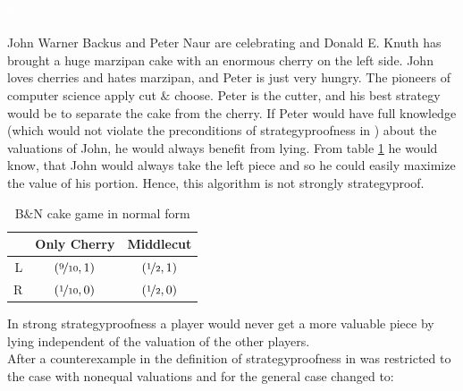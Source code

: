 \begin{bsp}
\label{bsp3}
\textcolor{white}{x}\\\\
John Warner Backus and Peter Naur are celebrating and Donald E. Knuth has brought a huge marzipan cake with an enormous cherry on the left side. John loves cherries and hates marzipan, and Peter is just very hungry. The pioneers of computer science apply cut $\&$ choose. Peter is the cutter, and his best strategy would be to separate the cake from the cherry. If Peter would have full knowledge (which would not violate the preconditions of strategyproofness in \cite{why}) about the valuations of John, he would always benefit from lying. From table \ref{Table4} he would know, that John would always take the left piece and so he could easily maximize the value of his portion. Hence, this algorithm is not strongly strategyproof.  
\end{bsp}
\begin{table}[htb]
\centering
 \renewcommand{\arraystretch}{1.2} 
\begin{tabular}{c|c|c|}
\cline{2-3}
&\multicolumn{1}{|c|}{{Only Cherry}}& {Middlecut}\\
\hline
\multicolumn{1}{|r|}{{L}}&$\left(\nicefrac{9}{10}, 1\right)$&$\left(\nicefrac{1}{2}, 1\right)$\\
\hline
\multicolumn{1}{|r|}{{R}}&$\left(\nicefrac{1}{10}, 0\right)$&$\left(\nicefrac{1}{2}, 0\right)$\\
\hline
\end{tabular}
\caption{B$\&$N cake game in normal form}\label{Table4}
\end{table}
\newpage
In strong strategyproofness a player would never get a more valuable piece by lying independent of the valuation of the other players.\\
\newline
After a counterexample in \cite{ccc} the definition of strategyproofness in \cite{pie} was restricted to the case with nonequal valuations and for the general case changed to:


